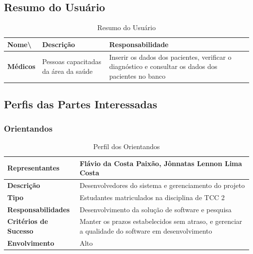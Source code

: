 \begin{anexosenv}
\subsection{Resumo do Usuário}

    \begin{table}[]
        \centering
        \caption{Resumo do Usuário}
        \begin{tabular}{@{}|l|l|l|@{}}
        \toprule
        \textbf{Nome\textbackslash{}} & \textbf{Descrição}                   & \textbf{Responsabilidade}                                                                           \\ \midrule
        \textbf{Médicos}              & Pessoas capacitadas da área da saúde & Inserir os dados dos pacientes, verificar o diagnóstico e consultar os dados dos pacientes no banco \\ \bottomrule
        \end{tabular}
        \label{table:Resumo do Usuário}
    \end{table}

\subsection{Perfis das Partes Interessadas}

\subsubsection{Orientandos}

    \begin{table}[]
        \centering
        \caption{Perfil dos Orientandos}
        \begin{tabular}{@{}|l|l|@{}}
        \toprule
        \textbf{Representantes}       & Flávio da Costa Paixão, Jônnatas Lennon Lima Costa                                                \\ \midrule
        \textbf{Descrição}            & Desenvolvedores do sistema e gerenciamento do projeto                                             \\ \midrule
        \textbf{Tipo}                 & Estudantes matriculados na disciplina de TCC 2                                                    \\ \midrule
        \textbf{Responsabilidades}    & Desenvolvimento da solução de software e pesquisa                                                 \\ \midrule
        \textbf{Critérios de Sucesso} & Manter os prazos estabelecidos sem atraso, e gerenciar a qualidade do software em desenvolvimento \\ \midrule
        \textbf{Envolvimento}         & Alto                                                                                              \\ \bottomrule
        \end{tabular}
        \label{table:Perfil dos Orientandos}
    \end{table}


\end{anexosenv}
